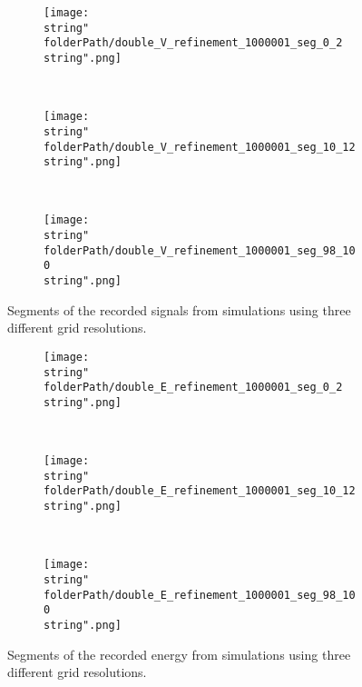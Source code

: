 
\renewcommand{\folderPath}{\string"./fig/1D_example/comparison/output_dt_1p000000000000000e-04/double_refinement/\string"}


\hspace{-0.05\textwidth}
\begin{minipage}[t]{.5\textwidth}
%
\begin{figure}[H]
\captionsetup{width=0.95\textwidth,font=footnotesize,labelfont=footnotesize}
\centering
%
\begin{subfigure}[b]{1\textwidth}
%
\centering\texttt{[image: \\string"\\folderPath/double\_V\_refinement\_1000001\_seg\_0\_2\\string".png]}
%
\end{subfigure}\hfill
\\[2ex]
%
\begin{subfigure}[b]{1\textwidth}
%
\centering\texttt{[image: \\string"\\folderPath/double\_V\_refinement\_1000001\_seg\_10\_12\\string".png]}
%
\end{subfigure}\hfill
\\[2ex]
%
\begin{subfigure}[b]{1\textwidth}
%
\centering\texttt{[image: \\string"\\folderPath/double\_V\_refinement\_1000001\_seg\_98\_100\\string".png]}
%
\end{subfigure}\hfill
%
\caption{Segments of the recorded signals from simulations using three different grid resolutions.}
\label{double_Refinement_V_segments}
\end{figure}
%
\end{minipage}
%
\hfill %
%
\begin{minipage}[t]{.5\textwidth}
%
\begin{figure}[H]
\captionsetup{width=0.95\textwidth,font=footnotesize,labelfont=footnotesize}
\centering
%
\begin{subfigure}[b]{1\textwidth}
%
\centering\texttt{[image: \\string"\\folderPath/double\_E\_refinement\_1000001\_seg\_0\_2\\string".png]}
%
\end{subfigure}\hfill
\\[2ex]
%
\begin{subfigure}[b]{1\textwidth}
%
\centering\texttt{[image: \\string"\\folderPath/double\_E\_refinement\_1000001\_seg\_10\_12\\string".png]}
%
\end{subfigure}\hfill
\\[2ex]
%
\begin{subfigure}[b]{1\textwidth}
%
\centering\texttt{[image: \\string"\\folderPath/double\_E\_refinement\_1000001\_seg\_98\_100\\string".png]}
%
\end{subfigure}\hfill
%
\caption{Segments of the recorded energy from simulations using three different grid resolutions.
}
\label{double_Refinement_E_segments}
\end{figure}
%
\end{minipage}

